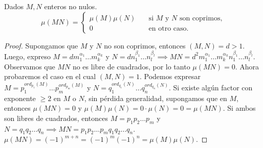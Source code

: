 \documentclass[main.tex]{subfiles}
\begin{document}
\begin{theorem}
    Dados $M, N$ enteros no nulos.
    \[
        \mu(MN) =
        \begin{cases}
        \mu(M)\mu(N) &\quad \text{si } M \text{ y } N \text{ son coprimos,} \\
        0 &\quad \text{en otro caso.}
        \end{cases}
    \]
\end{theorem}

\begin{proof}
    Supongamos que $M$ y $N$ no son coprimos, entonces 
    $(M, N) = d > 1$. Luego, expreso $M = d m_1^{\alpha_1} \dots m_k^{\alpha_k}$ y $N = d n_1^{\beta_1} \dots n_l^{\beta_l} \implies MN = d^2 m_1^{\alpha_1} \dots m_k^{\alpha_k} n_1^{\beta_1} \dots n_l^{\beta_l}$. Observamos que $MN$ no es libre de cuadrados, por lo tanto $\mu(MN) = 0$. Ahora probaremos el caso en el cual $(M, N) = 1$. Podemos expresar $M = p_1^{ord_{p_1}(M)} \dots p_m^{ord_{p_m}(M)}$ y $N = q_1^{ord_{q_1}(N)} \dots q_n^{ord_{q_n}(N)}$. Si existe alg\'un factor con exponente $\geq 2$ en $M$ o $N$, sin p\'erdida generalidad, supongamos que en $M$, entonces $\mu(MN) = 0$ y $\mu(M)\mu(N) = 0 \cdot \mu(N) = 0 = \mu(MN)$. Si ambos son libres de cuadrados, entonces $M = p_1 p_2 \dots p_m$ y $N = q_1 q_2 \dots q_n \implies MN = p_1 p_2 \dots p_m q_1 q_2 \dots q_n$. $\mu(MN) = (-1)^{m + n} = (-1)^m (-1)^n = \mu(M)\mu(N)$.
\end{proof}
\end{document}

